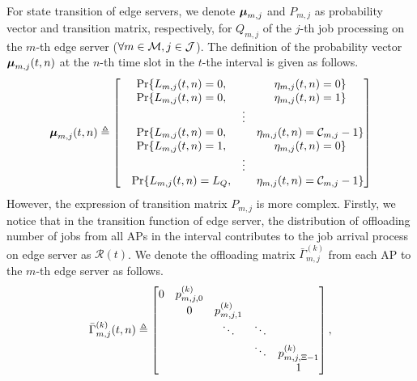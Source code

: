 For state transition of edge servers, we denote $\boldsymbol{\mu}_{m,j}$ and $P_{m,j}$ as probability vector and transition matrix, respectively, for $Q_{m,j}$ of the $j$-th job processing on the $m$-th edge server ($\forall m\in\mathcal{M}, j\in\mathcal{J}$). The definition of the probability vector $\boldsymbol{\mu}_{m,j}(t,n)$ at the $n$-th time slot in the $t$-the interval is given as follows.
\begin{align}
    \boldsymbol{\mu}_{m,j}(t,n) \triangleq 
    \begin{bmatrix}
        &\Pr\{L_{m,j}(t,n)=0,   &        & \eta_{m,j}(t,n)=0\} \\
        &\Pr\{L_{m,j}(t,n)=0,   &        & \eta_{m,j}(t,n)=1\} \\
        &                       & \vdots & \\
        &\Pr\{L_{m,j}(t,n)=0,   &        & \eta_{m,j}(t,n)=\mathcal{C}_{m,j}-1\} \\
        &\Pr\{L_{m,j}(t,n)=1,   &        & \eta_{m,j}(t,n)=0\} \\
        &                       & \vdots & \\
        &\Pr\{L_{m,j}(t,n)=L_Q, &        & \eta_{m,j}(t,n)=\mathcal{C}_{m,j}-1\}
    \end{bmatrix}
\end{align}
However, the expression of transition matrix $P_{m,j}$ is more complex. Firstly, we notice that in the transition function of edge server, the distribution of offloading number of jobs from all APs in the interval contributes to the job arrival process on edge server as $\mathcal{R}(t)$. We denote the offloading matrix $\bar{\Gamma}^{(k)}_{m,j}$ from each AP to the $m$-th edge server as follows.
\begin{align}
    \bar{\Gamma}^{(k)}_{m,j}(t,n) \triangleq
    \begin{bmatrix}
        0 & p^{(k)}_{m,j,0} &                 &        &                     \\
          & 0               & p^{(k)}_{m,j,1} &        &                     \\
          &                 & \ddots          & \ddots &                     \\
          &                 &                 & \ddots & p^{(k)}_{m,j,\Xi-1} \\
          &                 &                 &        & 1                   \\
    \end{bmatrix},
\end{align}
